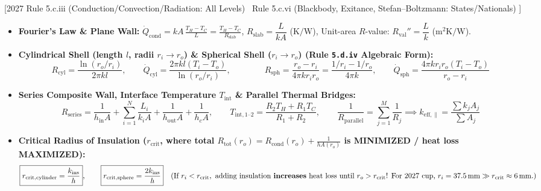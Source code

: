 \documentclass[10pt,twoside,openany,letterpaper]{book}
\begin{document}
\begin{quicksheet}\label{qr:10}
[2027 Rule 5.c.iii (Conduction/Convection/Radiation: All Levels) \textbar\ Rule 5.c.vi (Blackbody, Exitance, Stefan--Boltzmann: States/Nationals) ]

\begin{formulacard}
\scriptsize
\begin{itemize}
  \item \textbf{Fourier's Law \& Plane Wall:} $\displaystyle \dot{Q}_{\mathrm{cond}} = k A\,\frac{T_H - T_C}{L} = \frac{T_H - T_C}{R_{\mathrm{slab}}}$, \quad $R_{\mathrm{slab}} = \dfrac{L}{kA}$ ($\si{\kelvin\per\watt}$), \quad Unit-area $R$-value: $R_{\mathrm{val}}'' = \dfrac{L}{k}$ ($\si{\square\meter\kelvin\per\watt}$).
  \item \textbf{Cylindrical Shell (length $l$, radii $r_i \to r_o$) \& Spherical Shell ($r_i \to r_o$) (Rule \texttt{5.d.iv} Algebraic Form):}
  \[
    \boxed{R_{\mathrm{cyl}} = \frac{\ln(r_o/r_i)}{2\pi k l}, \qquad \dot{Q}_{\mathrm{cyl}} = \frac{2\pi k l(T_i - T_o)}{\ln(r_o/r_i)}}, \qquad \qquad \boxed{R_{\mathrm{sph}} = \frac{r_o - r_i}{4\pi k r_i r_o} = \frac{1/r_i - 1/r_o}{4\pi k}, \qquad \dot{Q}_{\mathrm{sph}} = \frac{4\pi k r_i r_o(T_i - T_o)}{r_o - r_i}}
  \]
  \item \textbf{Series Composite Wall, Interface Temperature $T_{\mathrm{int}}$ \& Parallel Thermal Bridges:}
  \[
    R_{\mathrm{series}} = \frac{1}{h_{\mathrm{in}}A} + \sum_{i=1}^N \frac{L_i}{k_i A} + \frac{1}{h_{\mathrm{out}}A} + \frac{1}{h_c A}, \qquad \boxed{T_{\mathrm{int,1\text{--}2}} = \frac{R_2 T_H + R_1 T_C}{R_1 + R_2}}, \qquad \frac{1}{R_{\mathrm{parallel}}} = \sum_{j=1}^M \frac{1}{R_j} \implies k_{\mathrm{eff},\parallel} = \frac{\sum k_j A_j}{\sum A_j}
  \]
  \item \textbf{Critical Radius of Insulation ($r_{\mathrm{crit}}$, where total $R_{\mathrm{tot}}(r_o) = R_{\mathrm{cond}}(r_o) + \frac{1}{h A(r_o)}$ is MINIMIZED / heat loss MAXIMIZED):}
  \[
    \boxed{r_{\mathrm{crit,cylinder}} = \frac{k_{\mathrm{ins}}}{h}}, \qquad \boxed{r_{\mathrm{crit,sphere}} = \frac{2 k_{\mathrm{ins}}}{h}} \quad (\text{If } r_i < r_{\mathrm{crit}},\text{ adding insulation \textbf{increases} heat loss until } r_o > r_{\mathrm{crit}}\text{! For 2027 cup, } r_i=\SI{37.5}{\milli\meter} \gg r_{\mathrm{crit}}\approx\SI{6}{\milli\meter}.)
\]
\end{itemize}
\end{formulacard}
\end{quicksheet}
\end{document}
